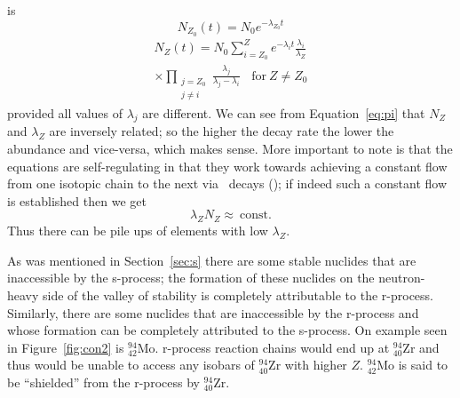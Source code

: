 {\cite{iliadis2008} is
\begin{equation}
N_{Z_0}(t) = N_0 e^{-\lambda_{Z_0} t}
\end{equation}
\begin{multline}
\label{eq:pi}
N_Z(t) = N_0 \sum_{i=Z_0}^Z e^{-\lambda_i
  t}\frac{\lambda_i}{\lambda_Z} \\
\times \prod_{\substack{j=Z_0\\ j\neq i}} \frac{\lambda_j}{\lambda_j -
  \lambda_i}~~~~\textrm{for}~Z\neq Z_0
\end{multline}
provided all values of $\lambda_j$ are different.  
We can see from Equation~\ref{eq:pi} that $N_Z$ and $\lambda_Z$ are
inversely related; so the higher the decay rate the lower the
abundance and vice-versa, which makes sense.  More important to note
is that the equations are self-regulating in that they work towards
achieving a constant flow from one isotopic chain to the next via
\bminus\ decays (\citealt{iliadis2008}); if indeed such a constant
flow is established then we get
\begin{equation}
\lambda_ZN_Z \approx ~ \textrm{const}.
\end{equation}
Thus there can be pile ups of elements with low $\lambda_Z$.


As was mentioned in Section~\ref{sec:s} there are some stable nuclides
that are inaccessible by the s-process; the formation of these
nuclides on the neutron-heavy side of the valley of stability
is completely attributable to the r-process.   Similarly, there are
some nuclides that are inaccessible by the r-process and whose
formation can be completely attributed to the s-process.  On example
seen in Figure~\ref{fig:con2} is $^{94}_{42}$Mo.  r-process reaction chains would end up at $^{94}_{40}$Zr and
thus would be unable to access any isobars of $^{94}_{40}$Zr with higher $Z$.  $^{94}_{42}$Mo
is said to be ``shielded'' from the r-process by $^{94}_{40}$Zr.



}

